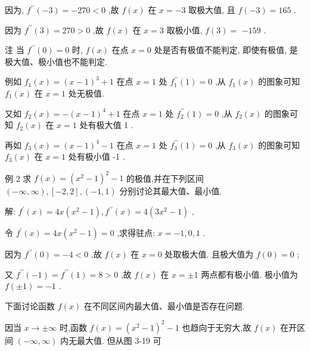 \documentclass[lang=cn,newtx,12pt,scheme=chinese]{elegantbook}
\begin{document}
因为, \({f}^{\prime \prime }\left( {-3}\right) = - {270} < 0\) ,故 \(f\left( x\right)\) 在 \(x = - 3\) 取极大值, 且 \(f\left( {-3}\right) = {165}\) .

因为 \({f}^{\prime \prime }\left( 3\right) = {270} > 0\) ,故 \(f\left( x\right)\) 在 \(x = 3\) 取极小值, \(f\left( 3\right) =\) \(- {159}\) .

注 当 \({f}^{\prime \prime }\left( 0\right) = 0\) 时, \(f\left( x\right)\) 在点 \(x = 0\) 处是否有极值不能判定, 即使有极值, 是极大值、极小值也不能判定.

例如 \({f}_{1}\left( x\right) = {\left( x - 1\right) }^{3} + 1\) 在点 \(x = 1\) 处 \({f}_{1}^{\prime \prime }\left( 1\right) = 0\) ,从 \({f}_{1}\left( x\right)\) 的图象可知 \({f}_{1}\left( x\right)\) 在 \(x = 1\) 处无极值.

又如 \({f}_{2}\left( x\right) = - {\left( x - 1\right) }^{4} + 1\) 在点 \(x = 1\) 处 \({f}_{2}^{\prime \prime }\left( 1\right) = 0\) ,从 \({f}_{2}\left( x\right)\) 的图象可知 \({f}_{2}\left( x\right)\) 在 \(x = 1\) 处有极大值 1 .

再如 \({f}_{3}\left( x\right) = {\left( x - 1\right) }^{4} - 1\) 在点 \(x = 1\) 处 \({f}_{3}^{\prime \prime }\left( 1\right) = 0\) ,从 \({f}_{3}\left( x\right)\) 的图象可知 \({f}_{3}\left( x\right)\) 在 \(x = 1\) 处有极小值 -1 .

例 2 求 \(f\left( x\right) = {\left( {x}^{2} - 1\right) }^{2} - 1\) 的极值,并在下列区间 \(\left( {-\infty ,\infty }\right) ,\left\lbrack {-2,2}\right\rbrack ,\left( {-1,1}\right)\) 分别讨论其最大值、最小值.

解: \({f}^{\prime }\left( x\right) = {4x}\left( {{x}^{2} - 1}\right) ,{f}^{\prime \prime }\left( x\right) = 4\left( {3{x}^{2} - 1}\right)\) ,

令 \({f}^{\prime }\left( x\right) = {4x}\left( {{x}^{2} - 1}\right) = 0\) ,求得驻点: \(x = - 1,0,1\) .

因为 \({f}^{\prime \prime }\left( 0\right) = - 4 < 0\) ,故 \(f\left( x\right)\) 在 \(x = 0\) 处取极大值. 且极大值为 \(f\left( 0\right) = 0\) ;

又 \({f}^{\prime \prime }\left( {-1}\right) = {f}^{\prime \prime }\left( 1\right) = 8 > 0\) ,故 \(f\left( x\right)\) 在 \(x = \pm 1\) 两点都有极小值. 极小值为 \(f\left( {\pm 1}\right) = - 1\) .

下面讨论函数 \(f\left( x\right)\) 在不同区间内最大值、最小值是否存在问题.

因当 \(x \rightarrow \pm \infty\) 时,函数 \(f\left( x\right) = {\left( {x}^{2} - 1\right) }^{2} - 1\) 也趋向于无穷大,故 \(f\left( x\right)\) 在开区间 \(\left( {-\infty ,\infty }\right)\) 内无最大值. 但从图 3-19 可
\end{document}
